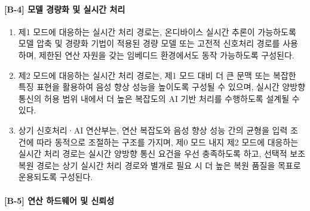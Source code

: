 \documentclass{article}
\DeclareRobustCommand{\codexedit}[1]{\textcolor{customorange}{#1}}
\begin{document}
\paragraph{[B-4] 모델 경량화 및 실시간 처리}

\begin{enumerate}[label = \textbf{(B.4.\arabic*)}]

    \item \codexedit{제1 모드에 대응하는 실시간 처리 경로는, 온디바이스 실시간 추론이 가능하도록
    모델 압축 및 경량화 기법이 적용된 경량 모델 또는 고전적 신호처리 경로를
    사용하며, 제한된 연산 자원을 갖는 임베디드 환경에서도 동작 가능하도록 구성된다.}

    \item \codexedit{제2 모드에 대응하는 실시간 처리 경로는, 제1 모드 대비 더 큰 문맥 또는 복잡한 특징 표현을 활용하여 음성 향상 성능을 높이도록 구성될 수 있으며, 실시간 양방향 통신의 허용 범위 내에서 더 높은 복잡도의 AI 기반 처리를 수행하도록 설계될 수 있다.}

    \item \codexedit{상기 신호처리·AI 연산부는, 연산 복잡도와 음성 향상 성능 간의
    균형을 입력 조건에 따라 동적으로 조절하는 구조를 가지며, 제0 모드 내지 제2 모드에 대응하는 실시간 처리 경로는 실시간 양방향 통신 요건을 우선 충족하도록 하고, 선택적 보조 복원 경로는 상기 실시간 처리 경로와 별개로 필요 시 더 높은 복원 품질을 목표로 운용되도록 구성된다.
    }

\end{enumerate}


\paragraph{[B-5] 연산 하드웨어 및 신뢰성}
\end{document}
